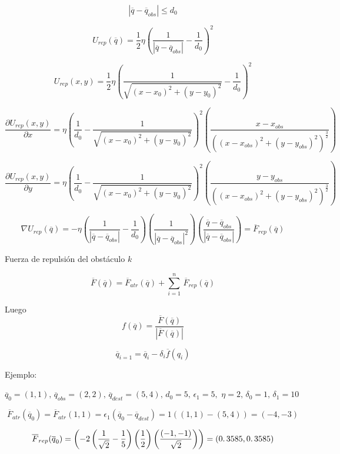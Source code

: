 $$\left| \overline{q} - \overline{q}_{obs}\right| \leq d_{0}$$ 

$$U_{rep}(\overline{q}) = \dfrac{1}{2} \eta \left( \dfrac{1}{\left| \overline{q} - \overline{q}_{obs}\right|}  
- \dfrac{1}{d_{0}} \right)^2$$

$$U_{rep}(x,y) = \dfrac{1}{2} \eta \left( \dfrac{1}{\sqrt{(x - x_{0})^2 + (y - y_{0})^2}}  
- \dfrac{1}{d_{0}} \right)^2$$

$$\dfrac{\partial U_{rep}(x,y)}{\partial x} = \eta \left( \dfrac{1}{d_{0}}  
-  \dfrac{1}{\sqrt{(x - x_{0})^2 + (y - y_{0})^2}} \right)^2 \left( \dfrac{x - x_{obs}}{\left( (x - x_{obs})^2 + (y - y_{obs})^2 \right)^{\frac{3}{2}}} \right)$$

$$\dfrac{\partial U_{rep}(x,y)}{\partial y} = \eta \left( \dfrac{1}{d_{0}}  
-  \dfrac{1}{\sqrt{(x - x_{0})^2 + (y - y_{0})^2}} \right)^2 \left( \dfrac{y - y_{obs}}{\left( (x - x_{obs})^2 + (y - y_{obs})^2 \right)^{\frac{3}{2}}} \right)$$

$$\nabla U_{rep}(\overline{q}) = -\eta \left( \dfrac{1}{\left| \overline{q} - \overline{q}_{obs}\right|} - \dfrac{1}{d_{0}} \right)  \left( \dfrac{1}{\left| \overline{q} - \overline{q}_{obs}\right|^2}\right)  \left( \dfrac{\overline{q} - \overline{q}_{obs}}{\left| \overline{q} - \overline{q}_{obs}\right|}\right) = \overline{F}_{rep}(\overline{q})$$

Fuerza de repulsión del obstáculo $k$

$$\overline{F}(\overline{q}) = \overline{F}_{atr}(\overline{q}) + \displaystyle \sum_{i = 1}^{n} \, \overline{F}_{rep}(\overline{q})$$

Luego
$$f(\overline{q}) = \dfrac{\overline{F}(\overline{q})}{\left|  \overline{F}(\overline{q}) \right| }$$

$$\overline{q}_{i = 1} = \overline{q}_{i} - \delta_{i} \overline{f}(q_{i})$$

Ejemplo:


$\overline{q}_{0} = (1,1),\, \overline{q}_{obs} = (2,2),\, \overline{q}_{dest} = (5,4),\, d_{0} = 5,\, \epsilon_{1} = 5, \,\, \eta = 2,\, \delta_{0} = 1,\, \delta_{1} = 10$

$$\overline{F}_{atr}(\overline{q}_{0}) = \overline{F}_{atr}(1,1) = \epsilon_{1}(\overline{q}_{0} - \overline{q}_{dest}) = 1((1,1) - (5,4)) = (-4,-3)$$

$$\overline{F}_{rep}(\overline{q}_{0}) = \left( -2\left( \dfrac{1}{\sqrt{2}} - \dfrac{1}{5} \right) \left( \dfrac{1}{2} \right)  \left( \dfrac{(-1,-1)}{\sqrt{2}} \right) \right) = (0\ldotp3585,0\ldotp3585)$$

